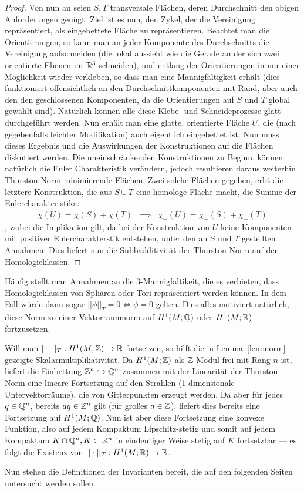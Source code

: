 \begin{proof}
            Von nun an seien $S,T$ transversale Flächen, deren Durchschnitt den obigen Anforderungen genügt. Ziel ist es nun, den Zykel, der die Vereinigung repräsentiert, als eingebettete Fläche zu repräsentieren. Beachtet man die Orientierungen, so kann man an jeder Komponente des Durchschnitts die Vereinigung aufschneiden (die lokal aussieht wie die Gerade an der sich zwei orientierte Ebenen im $\mathbb{R}^3$ schneiden), und entlang der Orientierungen in nur einer Möglichkeit wieder verkleben, so dass man eine Mannigfaltigkeit erhält (dies funktioniert offensichtlich an den Durchschnittkomponenten mit Rand, aber auch den den geschlossenen Komponenten, da die Orientierungen auf $S$ und $T$ global gewählt sind). Natürlich können alle diese Klebe- und Schneideprozesse glatt durchgeführt werden. Nun erhält man eine glatte, orientierte Fläche $U$, die (nach gegebenfalls leichter Modifikation) auch eigentlich eingebettet ist. Nun muss dieses Ergebnis und die Auswirkungen der Konstruktionen auf die Flächen diskutiert werden. Die uneinschränkenden Konstruktionen zu Beginn, können natürlich die Euler Charakteristik verändern, jedoch resultieren daraus weiterhin Thurston-Norm minimierende Flächen. Zwei solche Flächen gegeben, erbt die letztere Konstruktion, die aus $S\cup T$ eine homologe Fläche macht, die Summe der Eulercharakteristika:
            \begin{eqnarray*}
                \chi(U) = \chi(S) + \chi(T) &\implies& \chi_-(U)=\chi_-(S) + \chi_-(T)
            \end{eqnarray*}
            , wobei die Implikation gilt, da bei der Konstruktion von $U$ keine Komponenten mit positiver Eulercharakterstik entstehen, unter den an $S$ und $T$ gestellten Annahmen. Dies liefert nun die Subbadditivität der Thurston-Norm auf den Homologieklassen.
        \end{proof}

        Häufig stellt man Annahmen an die 3-Mannigfaltikeit, die es verbieten, dass Homologieklassen von Sphären oder Tori repräsentiert werden können. In dem Fall würde dann sogar $||\phi||_T=0 \Leftrightarrow \phi=0$ gelten. Dies alles motiviert natürlich, diese Norm zu einer Vektorraumnorm auf $H^1(M;\mathbb{Q})$ oder $H^1(M;\mathbb{R})$ fortzusetzen. 
        \begin{bem}
            Will man $||\cdot||_T: H^1(M;\mathbb{Z}) \to \mathbb{R}$ fortsetzen, so hilft die in Lemma~\ref{lem:norm} gezeigte Skalarmultiplikativität. Da $H^1(M;\mathbb{Z})$ als $\mathbb{Z}$-Modul frei mit Rang $n$ ist, liefert die Einbettung $\mathbb{Z}^n \hookrightarrow \mathbb{Q}^n$ zusammen mit der Linearität der Thurston-Norm eine lineare Fortsetzung auf den Strahlen (1-dimensionale Untervektorräume), die von Gitterpunkten erzeugt werden. Da aber für jedes $q \in \mathbb{Q}^n$, bereits $aq \in \mathbb{Z}^n$ gilt (für großes $a\in \mathbb{Z}$), liefert dies bereits eine Fortsetzung auf $H^1(M;\mathbb{Q})$. Nun ist aber diese Fortsetzung eine konvexe Funktion, also auf jedem Kompaktum Lipschitz-stetig und somit auf jedem Kompaktum $K\cap \mathbb{Q}^n, K\subset \mathbb{R}^n$ in eindeutiger Weise stetig auf $K$ fortsetzbar --- es folgt die Existenz von $||\cdot||_T:H^1(M;\mathbb{R}) \to \mathbb{R}$.
        \end{bem}
        Nun stehen die Definitionen der Invarianten bereit, die auf den folgenden Seiten untersucht werden sollen.